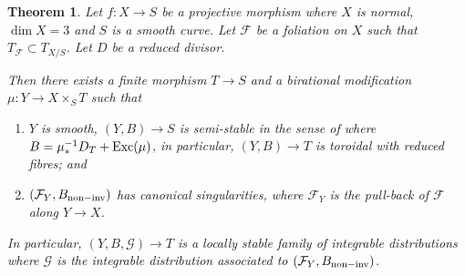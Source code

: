 \documentclass[12pt, a4paper]{amsart}
\newcounter{Theorem}
\newtheorem{theorem}{Theorem}[section]
\theoremstyle{definition}
\theoremstyle{named}
\begin{document}
\begin{theorem}
\label{thm_locally_stable_reduction}
Let $f\colon X \rightarrow S$ be a projective morphism where $X$ is normal, 
$\dim X = 3$ and $S$ is a smooth curve.  Let $\mathcal F$ be a foliation on $X$ such that
$T_{\mathcal F} \subset T_{X/S}$.  Let $D$ be a reduced divisor.


Then there exists a finite morphism $T \rightarrow S$ and a birational modification 
$\mu\colon Y \rightarrow X\times_ST$
such that 
\begin{enumerate}
\item $Y$ is smooth, $(Y, B) \rightarrow S$
is semi-stable in the sense of \cite{KKMS} 
where $B = \mu_*^{-1}D_T+{\rm Exc}(\mu)$, in particular, $(Y, B) \to T$ is toroidal with reduced fibres;
and 

\item  $(\mathcal F_Y, B_{{\rm non-inv}})$ has canonical singularities, 
where $\mathcal F_Y$ is the pull-back of $\mathcal F$ along $Y \rightarrow X$.
\end{enumerate}
In particular, $(Y, B, \mathcal G) \rightarrow T$ is a locally stable family of integrable distributions
where $\mathcal G$ is the integrable distribution associated to
$(\mathcal F_Y, B_{{\rm non-inv}})$.
\end{theorem}
\end{document}
